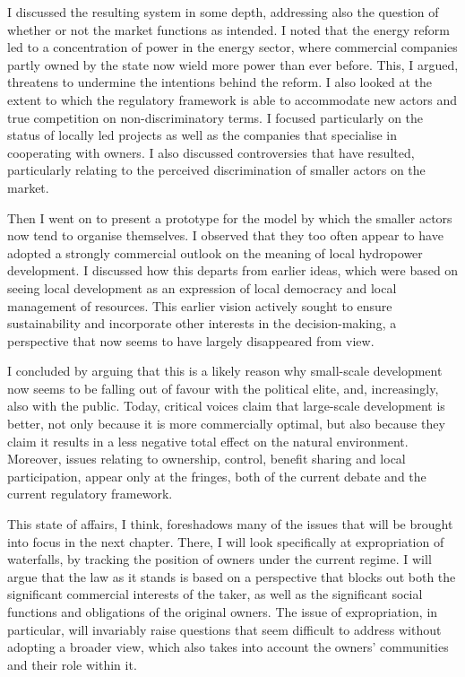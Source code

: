 I discussed the resulting system in some depth, addressing also the question of whether or not the market functions as intended. I noted that the energy reform led to a concentration of power in the energy sector, where commercial companies partly owned by the state now wield more power than ever before. This, I argued, threatens to undermine the intentions behind the reform. I also looked at the extent to which the regulatory framework is able to accommodate new actors and true competition on non-discriminatory terms. I focused particularly on the status of locally led projects as well as the companies that specialise in cooperating with owners. I also discussed controversies that have resulted, particularly relating to the perceived discrimination of smaller actors on the market.

Then I went on to present a prototype for the model by which the smaller actors now tend to organise themselves. I observed that they too often appear to have adopted a strongly commercial outlook on the meaning of local hydropower development. I discussed how this departs from earlier ideas, which were based on seeing local development as an expression of local democracy and local management of resources. This earlier vision actively sought to ensure sustainability and incorporate other interests in the decision-making, a perspective that now seems to have largely disappeared from view.

I concluded by arguing that this is a likely reason why small-scale development now seems to be falling out of favour with the political elite, and, increasingly, also with the public. Today, critical voices claim that large-scale development is better, not only because it is more commercially optimal, but also because they claim it results in a less negative total effect on the natural environment. Moreover, issues relating to ownership, control, benefit sharing and local participation, appear only at the fringes, both of the current debate and the current regulatory framework. 

This state of affairs, I think, foreshadows many of the issues that will be brought into focus in the next chapter. There, I will look specifically at expropriation of waterfalls, by tracking the position of owners under the current regime. I will argue that the law as it stands is based on a perspective that blocks out both the significant commercial interests of the taker, as well as the significant social functions and obligations of the original owners. The issue of expropriation, in particular, will invariably raise questions that seem difficult to address without adopting a broader view, which also takes into account the owners' communities and their role within it.